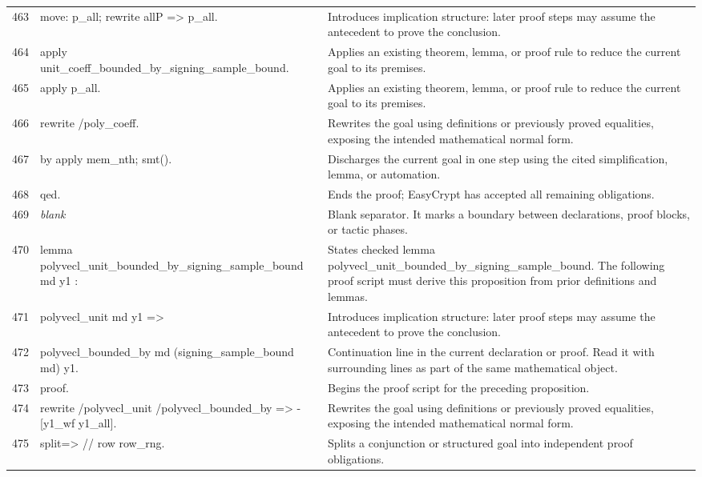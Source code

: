 \documentclass[10pt]{article}
\begin{document}
\begin{longtable}{r L{0.53\textwidth} L{0.37\textwidth}}
463 & {\ttfamily\scriptsize move: p\_all; rewrite allP => p\_all.} & Introduces implication structure: later proof steps may assume the antecedent to prove the conclusion. \\
464 & {\ttfamily\scriptsize apply unit\_coeff\_bounded\_by\_signing\_sample\_bound.} & Applies an existing theorem, lemma, or proof rule to reduce the current goal to its premises. \\
465 & {\ttfamily\scriptsize apply p\_all.} & Applies an existing theorem, lemma, or proof rule to reduce the current goal to its premises. \\
466 & {\ttfamily\scriptsize rewrite /poly\_coeff.} & Rewrites the goal using definitions or previously proved equalities, exposing the intended mathematical normal form. \\
467 & {\ttfamily\scriptsize by apply mem\_nth; smt().} & Discharges the current goal in one step using the cited simplification, lemma, or automation. \\
468 & {\ttfamily\scriptsize qed.} & Ends the proof; EasyCrypt has accepted all remaining obligations. \\
469 & {\ttfamily\scriptsize \emph{blank}} & Blank separator.  It marks a boundary between declarations, proof blocks, or tactic phases. \\
470 & {\ttfamily\scriptsize lemma polyvecl\_unit\_bounded\_by\_signing\_sample\_bound md y1 :} & States checked lemma polyvecl\_unit\_bounded\_by\_signing\_sample\_bound.  The following proof script must derive this proposition from prior definitions and lemmas. \\
471 & {\ttfamily\scriptsize   polyvecl\_unit md y1 =>} & Introduces implication structure: later proof steps may assume the antecedent to prove the conclusion. \\
472 & {\ttfamily\scriptsize   polyvecl\_bounded\_by md (signing\_sample\_bound md) y1.} & Continuation line in the current declaration or proof.  Read it with surrounding lines as part of the same mathematical object. \\
473 & {\ttfamily\scriptsize proof.} & Begins the proof script for the preceding proposition. \\
474 & {\ttfamily\scriptsize rewrite /polyvecl\_unit /polyvecl\_bounded\_by => -[y1\_wf y1\_all].} & Rewrites the goal using definitions or previously proved equalities, exposing the intended mathematical normal form. \\
475 & {\ttfamily\scriptsize split=> // row row\_rng.} & Splits a conjunction or structured goal into independent proof obligations. \\

\end{longtable}
\end{document}

